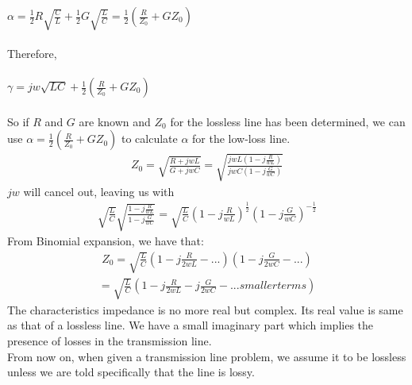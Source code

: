 $\alpha = \frac{1}{2}R\sqrt{\frac{C}{L}} + \frac{1}{2}G\sqrt{\frac{L}{C}} = \frac{1}{2}(\frac{R}{Z_0} + GZ_0)$\\\\
Therefore,\\\\
$\gamma = jw\sqrt{LC} + \frac{1}{2}(\frac{R}{Z_0} + GZ_0)$\\\\
So if $R$ and $G$ are known and $Z_0$ for the lossless line has been determined, we can use $\alpha = \frac{1}{2}(\frac{R}{Z_0} + GZ_0)$ to calculate $\alpha$ for the low-loss line.
\begin{align*}
Z_0 = \sqrt{\frac{R + jwL}{G + jwC}} = \sqrt{\frac{jwL(1 - j\frac{R}{wL})}{jwC(1 - j\frac{G}{wC})}}
\end{align*}
$jw$ will cancel out, leaving us with
\begin{align*}
\sqrt{\frac{L}{C}}\sqrt{\frac{1 - j\frac{R}{wL}}{1 - j\frac{G}{wC}}} =\sqrt{\frac{L}{C}}(1 - j\frac{R}{wL})^{\frac{1}{2}}(1 - j\frac{G}{wC})^{-\frac{1}{2}} 
\end{align*}
From Binomial expansion, we have that:
\begin{align*}
Z_0 = \sqrt{\frac{L}{C}}(1 - j\frac{R}{2wL} - ...)(1 - j\frac{G}{2wC} - ...)
\end{align*}
\begin{align*}
= \sqrt{\frac{L}{C}}(1 - j\frac{R}{2wL} - j\frac{G}{2wC} - ...smaller terms)
\end{align*}
The characteristics impedance is no more real but complex. Its real value is same as that of a lossless line. We have a small imaginary part which implies the presence of losses in the transmission line.\\

From now on, when given a transmission line problem, we assume it to be lossless unless we are told specifically that the line is lossy.